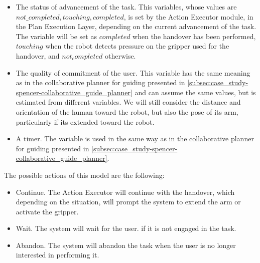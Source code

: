 \begin{itemize}
\item The status of advancement of the task. This variables, whose values are ${not\_completed, touching, completed}$, is set by the Action Executor module, in the Plan Execution Layer, depending on the current advancement of the task. The variable will be set as $completed$ when the handover has been performed, $touching$ when the robot detects pressure on the gripper used for the handover, and $not_completed$ otherwise. 
\item The quality of commitment of the user. This variable has the same meaning as in the collaborative planner for guiding presented in \ref{subsec:case_study-spencer-collaborative_guide_planner} and can assume the same values, but is estimated from different variables. We will still consider the distance and orientation of the human toward the robot, but also the pose of its arm, particularly if its extended toward the robot. 
\item A timer. The variable is used in the same way as in the collaborative planner for guiding presented in \ref{subsec:case_study-spencer-collaborative_guide_planner}.
\end{itemize}

The possible actions of this model are the following:
\begin{itemize}
\item Continue. The Action Executor will continue with the handover, which depending on the situation, will prompt the system to extend the arm or activate the gripper.
\item Wait. The system will wait for the user. if it is not engaged in the task.
\item Abandon. The system will abandon the task when the user is no longer interested in performing it. 
\end{itemize} 


